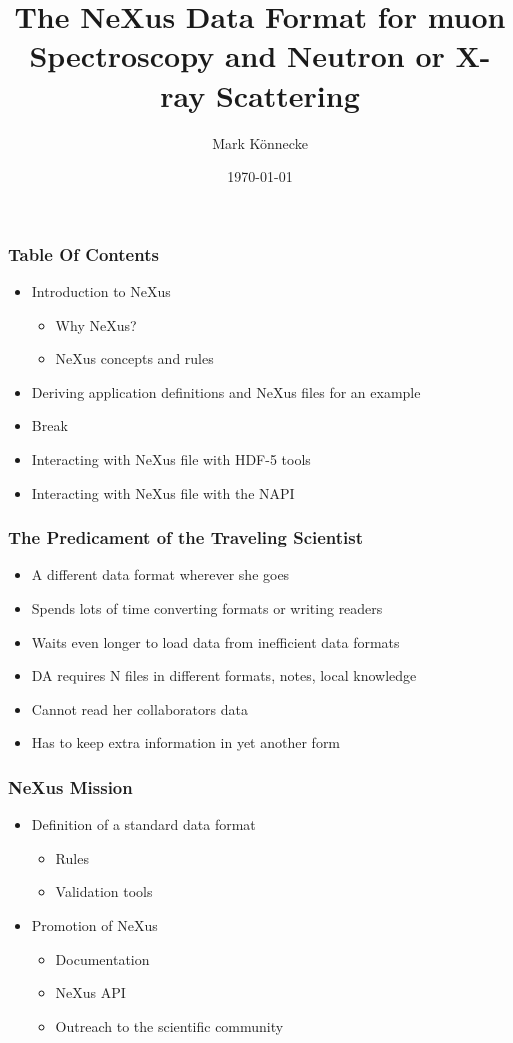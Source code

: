 \documentclass{beamer}
\title{The NeXus Data Format for muon Spectroscopy and Neutron or X-ray Scattering }
\author{Mark K\"onnecke }
\institute{Paul Scherrer Institute\\Switzerland }
\date{\today}
\begin{document}
\begin{frame}
\titlepage
\end{frame}

\begin{frame}
\frametitle{Table Of Contents}
\begin{itemize}
\item Introduction to NeXus
\begin{itemize}
\item Why NeXus?
\item NeXus concepts and rules
\end{itemize}
\item Deriving application definitions and NeXus files 
 for an example
\item Break
\item Interacting with NeXus file with HDF-5 tools
\item Interacting with NeXus file with the NAPI
\end{itemize}
\end{frame}

\begin{frame}
\frametitle{The Predicament of the Traveling Scientist}
\begin{itemize}
\item<1->A different data format wherever she goes
\item<2->Spends lots of time converting formats or writing readers
\item<3->Waits even longer to load data from inefficient data formats
\item<4->DA requires N files in different  formats, notes, local knowledge 
\item<5->Cannot read her collaborators data
\item<6->Has to keep extra information in yet another form
\end{itemize}
\end{frame}

\begin{frame} \frametitle{NeXus Mission}
\begin{itemize}
\item Definition of a standard data format
\begin{itemize}
\item Rules
\item Validation tools
\end{itemize}
\item Promotion of NeXus
\begin{itemize}
\item Documentation
\item NeXus API
\item Outreach to the scientific community
\end{itemize}
\end{itemize}
\end{frame}
\end{document}
